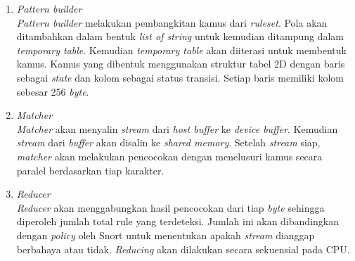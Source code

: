       \begin{enumerate}

        \item 
        \emph{Pattern builder} \\
        \emph{Pattern builder} melakukan pembangkitan kamus dari \emph{ruleset}. Pola akan ditambahkan dalam bentuk \emph{list of string} untuk kemudian ditampung dalam \emph{temporary table}. Kemudian \emph{temporary table} akan diiterasi untuk membentuk kamus. Kamus yang dibentuk menggunakan struktur tabel 2D dengan baris sebagai \emph{state} dan kolom sebagai status transisi. Setiap baris memiliki kolom sebesar 256 \emph{byte}.

        \item
        \emph{Matcher} \\
        \emph{Matcher} akan menyalin \emph{stream} dari \emph{host buffer} ke \emph{device buffer}. Kemudian \emph{stream} dari \emph{buffer} akan disalin ke \emph{shared memory}. Setelah \emph{stream} siap, \emph{matcher} akan melakukan pencocokan dengan menelusuri kamus secara paralel berdasarkan tiap karakter.

        \item
        \emph{Reducer} \\
        \emph{Reducer} akan menggabungkan hasil pencocokan dari tiap \emph{byte} sehingga diperoleh jumlah total rule yang terdeteksi. Jumlah ini akan dibandingkan dengan \emph{policy} oleh Snort untuk menentukan apakah \emph{stream} dianggap berbahaya atau tidak. \emph{Reducing} akan dilakukan secara sekuensial pada CPU.
        
      \end{enumerate}